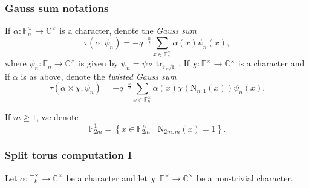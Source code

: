 \documentclass[12pt, reqno]{amsart}
\theoremstyle{definition}
\theoremstyle{definition}
\theoremstyle{definition}
\newcommand{\cComplex}{\mathbb{C}}
\newcommand{\multiplicativegroup}[1]{#1^{\times}}
\newcommand{\fieldCharacter}{\psi}
\newcommand{\trace}{\operatorname{tr}}
\newcommand{\FieldNorm}[2]{\mathrm{N}_{#1:#2}}
\newcommand{\finiteField}{\mathbb{F}}
\newcommand{\finiteFieldExtension}[1]{\finiteField_{#1}}
\begin{document}
\subsubsection{Gauss sum notations}
If $\alpha \colon \multiplicativegroup{\finiteFieldExtension{n}} \to \multiplicativegroup{\cComplex}$ is a character, denote the \emph{Gauss sum} $$\tau\left(\alpha, \fieldCharacter_n\right) = -q^{-\frac{n}{2}}\sum_{x \in \multiplicativegroup{\finiteFieldExtension{n}}} \alpha\left(x\right) \fieldCharacter_n\left(x\right),$$
where $\fieldCharacter_n \colon \finiteFieldExtension{n} \to \multiplicativegroup{\cComplex}$ is given by $\fieldCharacter_n = \fieldCharacter \circ \trace_{\finiteFieldExtension{n} \slash \finiteField}$. If $\chi \colon \multiplicativegroup{\finiteField} \to \multiplicativegroup{\cComplex}$ is a character and if $\alpha$ is as above, denote the \emph{twisted Gauss sum}
$$\tau\left(\alpha \times \chi, \fieldCharacter_n\right) = -q^{-\frac{n}{2}}\sum_{x \in \multiplicativegroup{\finiteFieldExtension{n}}} \alpha\left(x\right) \chi\left( \FieldNorm{n}{1}\left(x\right)\right) \fieldCharacter_n\left(x\right).$$

If $m \ge 1$, we denote 
$$\finiteFieldExtension{2m}^1 = \left\{ x \in \multiplicativegroup{\finiteFieldExtension{2m}} \mid \FieldNorm{2m}{m}\left(x\right)= 1\right\}.$$

\subsubsection{Split torus computation I}
Let $\alpha \colon \multiplicativegroup{\finiteFieldExtension{k}} \to \multiplicativegroup{\cComplex}$ be a character and let $\chi \colon \multiplicativegroup{\finiteField} \to \multiplicativegroup{\cComplex}$ be a non-trivial character.
\end{document}
